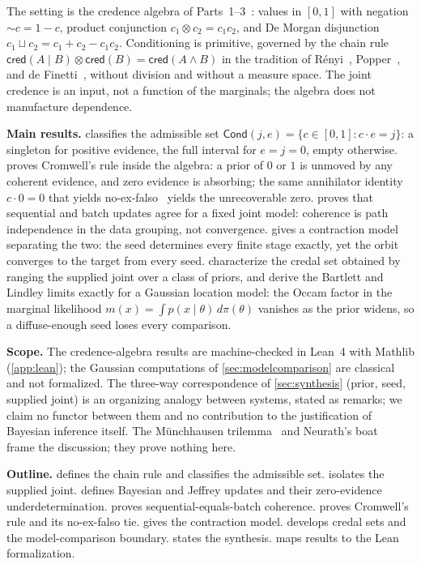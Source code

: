 \documentclass[11pt,a4paper]{article}
\newcommand{\cred}{\mathsf{cred}}
\newcommand{\negc}{\mathord{\sim}}
\newcommand{\conjc}{\otimes}
\newcommand{\disjc}{\sqcup}
\newcommand{\Cond}{\mathsf{Cond}}
\begin{document}
The setting is the credence algebra of Parts~1--3~\cite{part1,part2}:
values in $[0,1]$ with negation $\negc c = 1 - c$, product conjunction
$c_1 \conjc c_2 = c_1 c_2$, and De Morgan disjunction
$c_1 \disjc c_2 = c_1 + c_2 - c_1 c_2$.
Conditioning is primitive, governed by the chain rule
$\cred(A \mid B) \conjc \cred(B) = \cred(A \land B)$ in the tradition of
R\'enyi~\cite{renyi1955}, Popper~\cite{popper1959}, and
de Finetti~\cite{definetti1936}, without division and without a measure
space.
The joint credence is an input, not a function of the marginals; the
algebra does not manufacture dependence.

\textbf{Main results.}
 classifies the admissible set
$\Cond(j,e) = \{c \in [0,1] : c \cdot e = j\}$:
a singleton for positive evidence, the full interval for $e = j = 0$,
empty otherwise.
 proves Cromwell's rule inside the algebra: a prior
of $0$ or $1$ is unmoved by any coherent evidence, and zero evidence is
absorbing; the same annihilator identity $c \cdot 0 = 0$ that yields
no-ex-falso~\cite{part2} yields the unrecoverable zero.
 proves that sequential and batch updates agree for
a fixed joint model: coherence is path independence in the data
grouping, not convergence.
 gives a contraction model separating the two:
the seed determines every finite stage exactly, yet the orbit converges
to the target from every seed.
 characterize the credal
set obtained by ranging the supplied joint over a class of priors, and
 derive the Bartlett and Lindley limits
exactly for a Gaussian location model: the Occam factor in the marginal
likelihood $m(x) = \int p(x \mid \theta)\, d\pi(\theta)$ vanishes as the
prior widens, so a diffuse-enough seed loses every comparison.

\textbf{Scope.}
The credence-algebra results are machine-checked in Lean~4 with Mathlib
(\cref{app:lean}); the Gaussian computations of
\cref{sec:modelcomparison} are classical and not formalized.
The three-way correspondence of \cref{sec:synthesis} (prior, seed,
supplied joint) is an organizing analogy between systems, stated as
remarks; we claim no functor between them and no contribution to the
justification of Bayesian inference itself.
The M\"unchhausen trilemma~\cite{albert1968} and Neurath's
boat~\cite{neurath1932} frame the discussion; they prove nothing here.

\textbf{Outline.}
 defines the chain rule and classifies the
admissible set.
 isolates the supplied joint.
 defines Bayesian and Jeffrey updates and their
zero-evidence underdetermination.
 proves sequential-equals-batch coherence.
 proves Cromwell's rule and its no-ex-falso tie.
 gives the contraction model.
 develops credal sets and the model-comparison
boundary.
 states the synthesis.
 maps results to the Lean formalization.
\end{document}
